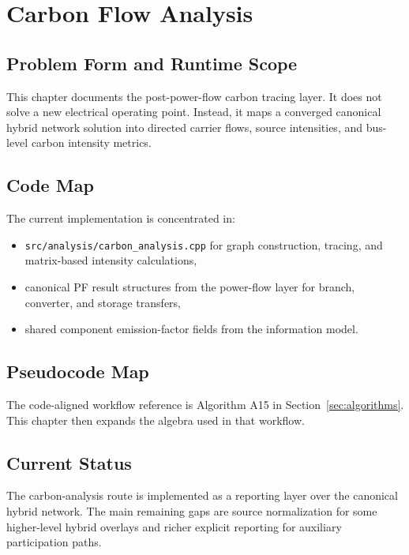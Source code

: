 \section{Carbon Flow Analysis}
\label{sec:carbon-analysis}

\subsection{Problem Form and Runtime Scope}

This chapter documents the post-power-flow carbon tracing layer.  It does not
solve a new electrical operating point.  Instead, it maps a converged canonical
hybrid network solution into directed carrier flows, source intensities, and
bus-level carbon intensity metrics.

\subsection{Code Map}

The current implementation is concentrated in:
\begin{itemize}
  \item \texttt{src/analysis/carbon\_analysis.cpp} for graph construction, tracing, and matrix-based intensity calculations,
  \item canonical PF result structures from the power-flow layer for branch, converter, and storage transfers,
  \item shared component emission-factor fields from the information model.
\end{itemize}

\subsection{Pseudocode Map}

The code-aligned workflow reference is Algorithm A15 in
Section~\ref{sec:algorithms}.  This chapter then expands the algebra used in
that workflow.

\subsection{Current Status}

The carbon-analysis route is implemented as a reporting layer over the canonical
hybrid network.  The main remaining gaps are source normalization for some
higher-level hybrid overlays and richer explicit reporting for auxiliary
participation paths.

